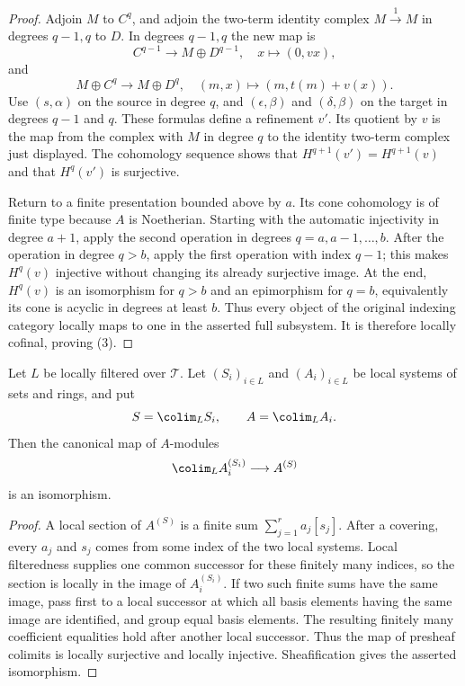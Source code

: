 \begin{proof}
Adjoin $M$ to $C^q$, and adjoin the two-term identity complex
$M \xrightarrow{1} M$ in degrees $q - 1,q$ to $D$. In degrees $q - 1,q$
the new map is
$$
C^{q - 1} \longrightarrow M \oplus D^{q - 1},\quad
x \longmapsto (0,vx),
$$
and
$$
M \oplus C^q \longrightarrow M \oplus D^q,\quad
(m,x) \longmapsto (m,t(m)+v(x)).
$$
Use $(s,\alpha)$ on the source in degree $q$, and
$(\epsilon,\beta)$ and $(\delta,\beta)$ on the target in degrees
$q - 1$ and $q$. These formulas define a refinement $v'$. Its quotient by
$v$ is the map from the complex with $M$ in degree $q$ to the identity
two-term complex just displayed. The cohomology sequence shows that
$H^{q + 1}(v')=H^{q + 1}(v)$ and that $H^q(v')$ is surjective.

Return to a finite presentation bounded above by $a$. Its cone cohomology
is of finite type because $A$ is Noetherian. Starting with the automatic
injectivity in degree $a + 1$, apply the second operation in degrees
$q=a,a-1,\ldots,b$. After the operation in degree $q>b$, apply the first
operation with index $q-1$; this makes $H^q(v)$ injective without changing
its already surjective image. At the end, $H^q(v)$ is an isomorphism for
$q>b$ and an epimorphism for $q=b$, equivalently its cone is acyclic in
degrees at least $b$. Thus every object of the original indexing category
locally maps to one in the asserted full subsystem. It is therefore locally
cofinal, proving (3).
\end{proof}

\begin{lemma}
\label{lemma-illusie-I-local-colimit-free-modules}
Let $L$ be locally filtered over $\mathcal{T}$. Let $(S_i)_{i \in L}$ and
$(A_i)_{i \in L}$ be local systems of sets and rings, and put
$$
S = \colim_L S_i, \qquad A = \colim_L A_i.
$$
Then the canonical map of $A$-modules
$$
\colim_L A_i^{(S_i)} \longrightarrow A^{(S)}
$$
is an isomorphism.
\end{lemma}

\begin{proof}
A local section of $A^{(S)}$ is a finite sum
$\sum_{j=1}^r a_j[s_j]$. After a covering, every $a_j$ and $s_j$ comes from
some index of the two local systems. Local filteredness supplies one common
successor for these finitely many indices, so the section is locally in the
image of $A_i^{(S_i)}$. If two such finite sums have the same image, pass
first to a local successor at which all basis elements having the same image
are identified, and group equal basis elements. The resulting finitely many
coefficient equalities hold after another local successor. Thus the map of
presheaf colimits is locally surjective and locally injective. Sheafification
gives the asserted isomorphism.
\end{proof}

